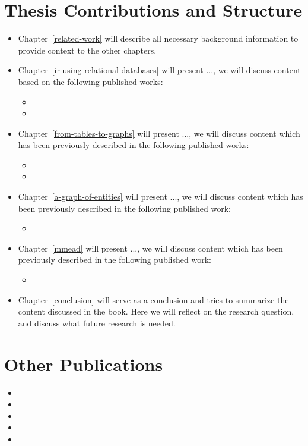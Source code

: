 \section{Thesis Contributions and Structure}

\begin{itemize}
\item Chapter~\ref{related-work} will describe all necessary background information to provide context to the other chapters. 

\item Chapter~\ref{ir-using-relational-databases} will present ..., we will discuss content based on the following published works: 
{
	\scriptsize
	\begin{itemize}
		\item {}
		\item {}
	\end{itemize}
}

\item Chapter~\ref{from-tables-to-graphs} will present ..., we will discuss content which has been previously described in the following published works:
{
	\scriptsize
	\begin{itemize}
		\item {}
		\item {}
	\end{itemize}
}

\item Chapter~\ref{a-graph-of-entities} will present ..., we will discuss content which has been previously described in the following published work: 
{
	\scriptsize
	\begin{itemize}
		\item {}
	\end{itemize}
}

\item Chapter~\ref{mmead} will present ..., we will discuss content which has been previously described in the following published work: {
\scriptsize
	\begin{itemize}
		\item {}
	\end{itemize}
}


\item Chapter~\ref{conclusion} will serve as a conclusion and tries to summarize the content discussed in the book. Here we will reflect on the research question, and discuss what future research is needed.
\end{itemize}

\section{Other Publications}

{\scriptsize
\begin{itemize}	
	\item {}
	\item {}	
	\item {}
	\item {}
	\item {}
\end{itemize}
}